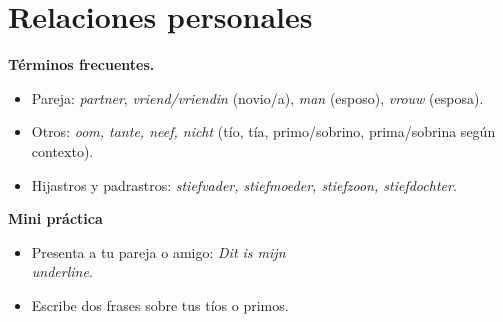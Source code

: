 \section{Relaciones personales}
\textbf{Términos frecuentes.}
\begin{itemize}[leftmargin=*]
  \item Pareja: \textit{partner}, \textit{vriend/vriendin} (novio/a), \textit{man} (esposo), \textit{vrouw} (esposa).
  \item Otros: \textit{oom, tante, neef, nicht} (tío, tía, primo/sobrino, prima/sobrina según contexto).
  \item Hijastros y padrastros: \textit{stiefvader, stiefmoeder, stiefzoon, stiefdochter}.
\end{itemize}

\textbf{Mini práctica}
\begin{itemize}[leftmargin=*]
  \item Presenta a tu pareja o amigo: \textit{Dit is mijn \\underline{\hspace{1.2cm}}}.
  \item Escribe dos frases sobre tus tíos o primos.
\end{itemize}
